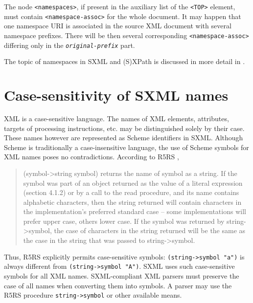 \documentclass[10pt]{article}
\begin{document}
The node \texttt{<namespaces>}, if present in the auxiliary list of the \texttt{<TOP>} element, must contain \texttt{<namespace-assoc>} for the whole document. It may happen that one
namespace URI is associated in the source XML document with several
namespace prefixes. There will be then several corresponding \texttt{<namespace-assoc>} differing only in the \texttt{{\itshape original-prefix}} part.

The topic of namespaces in SXML and (S)XPath is discussed in
more detail in \cite{SXML-NS}.

\section{Case-sensitivity of SXML names}
XML is a case-sensitive language. The names of XML elements,
attributes, targets of processing instructions, etc. may be
distinguished solely by their case. These names however are
represented as Scheme identifiers in SXML. Although Scheme is
traditionally a case-insensitive language, the use of Scheme symbols
for XML names poses no contradictions. According to R5RS \cite{R5RS}, \begin{quote}
(symbol->string symbol) returns the name of symbol as a string. If
the symbol was part of an object returned as the value of a literal
expression (section 4.1.2) or by a call to the read procedure, and its
name contains alphabetic characters, then the string returned will
contain characters in the implementation's preferred standard
case -- some implementations will prefer upper case, others lower
case. If the symbol was returned by string->symbol, the case of
characters in the string returned will be the same as the case in the
string that was passed to string->symbol.\end{quote}


Thus, R5RS explicitly permits case-sensitive symbols: \texttt{(string->symbol "a")} is always different from \texttt{(string->symbol "A")}. SXML uses such case-sensitive symbols for
all XML names. SXML-compliant XML parsers must preserve the case of
all names when converting them into symbols. A parser may use the R5RS
procedure \texttt{string->symbol} or other available means.
\end{document}
